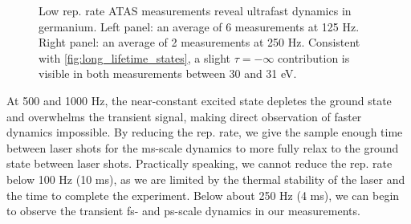 \begin{figure}
	\centering
	\qquad
	\caption{Low rep. rate ATAS measurements reveal ultrafast dynamics in germanium. Left panel: an average of 6 measurements at 125 Hz. Right panel: an average of 2 measurements at 250 Hz. Consistent with \cref{fig:long_lifetime_states}, a slight $\tau=-\infty$ contribution is visible in both measurements between 30 and 31 eV.}
	\label{fig:125vs250Hz_Ge_ATAS:delay}
\end{figure}

At 500 and 1000 Hz, the near-constant excited state depletes the ground state and overwhelms the transient signal, making direct observation of faster dynamics impossible. By reducing the rep. rate, we give the sample enough time between laser shots for the ms-scale dynamics to more fully relax to the ground state between laser shots. Practically speaking, we cannot reduce the rep. rate below 100 Hz (10 ms), as we are limited by the thermal stability of the laser and the time to complete the experiment. Below about 250 Hz (4 ms), we can begin to observe the transient fs- and ps-scale dynamics in our measurements.


